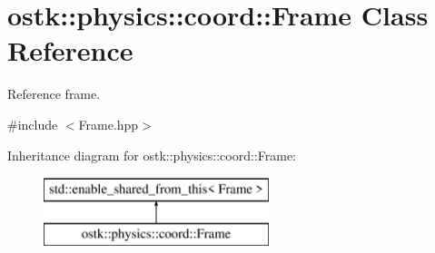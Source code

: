 \hypertarget{classostk_1_1physics_1_1coord_1_1_frame}{}\section{ostk\+:\+:physics\+:\+:coord\+:\+:Frame Class Reference}
\label{classostk_1_1physics_1_1coord_1_1_frame}


Reference frame.  




{\ttfamily \#include $<$Frame.\+hpp$>$}

Inheritance diagram for ostk\+:\+:physics\+:\+:coord\+:\+:Frame\+:\begin{figure}[H]
\begin{center}
\leavevmode
\includegraphics[height=2.000000cm]{classostk_1_1physics_1_1coord_1_1_frame}
\end{center}
\end{figure}
